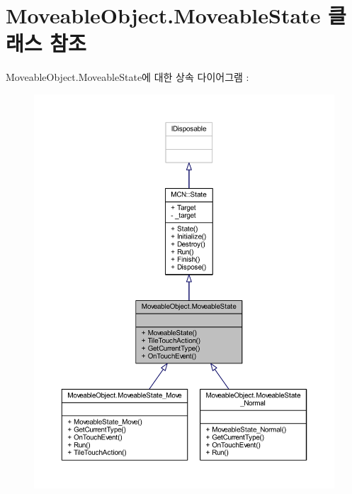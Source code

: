 \hypertarget{class_moveable_object_1_1_moveable_state}{}\section{Moveable\+Object.\+Moveable\+State 클래스 참조}
\label{class_moveable_object_1_1_moveable_state}


Moveable\+Object.\+Moveable\+State에 대한 상속 다이어그램 \+: \nopagebreak
\begin{figure}[H]
\begin{center}
\leavevmode
\includegraphics[width=350pt]{class_moveable_object_1_1_moveable_state__inherit__graph}
\end{center}
\end{figure}


